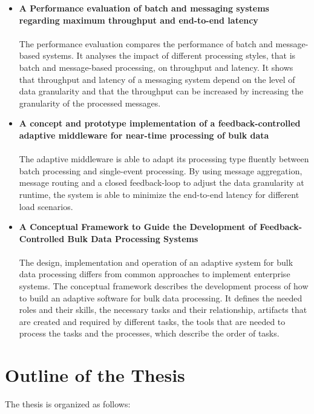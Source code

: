 \begin{itemize}
	\item \textbf{A Performance evaluation of batch and messaging systems regarding maximum throughput and end-to-end latency}\\\\
	The performance evaluation compares the performance of batch and message-based systems. It analyses the impact of different processing styles, that is batch and message-based processing, on throughput and latency. It shows that throughput and latency of a messaging system depend on the level of data granularity and that the throughput can be increased by increasing the granularity of the processed messages.
	\item \textbf{A concept and prototype implementation of a feed\-back-con\-trolled adaptive middleware for near-time processing of bulk data}\\\\
	The adaptive middleware is able to adapt its processing type fluently between batch processing and single-event processing. By using message aggregation, message routing and a closed feedback-loop to adjust the data granularity at runtime, the system is able to minimize the end-to-end latency for different load scenarios.
	\item \textbf{A Conceptual Framework to Guide the Development of Feed\-back-Controlled Bulk Data Processing Systems}\\\\
	The design, implementation and operation of an adaptive system for bulk data processing differs from common approaches to implement enterprise systems.
	The conceptual framework describes the development process of how to build an adaptive software for bulk data processing. It defines the needed roles and their skills, the necessary tasks and their relationship, artifacts that are created and required by different tasks, the tools that are needed to process the tasks and the processes, which describe the order of tasks.
\end{itemize}

\section{Outline of the Thesis}\label{sec:thesis_outline}

The thesis is organized as follows:

